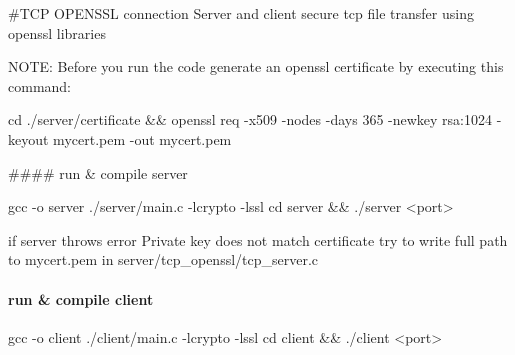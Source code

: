 \#\+T\+CP O\+P\+E\+N\+S\+SL connection Server and client secure tcp file transfer using openssl libraries

N\+O\+TE\+: Before you run the code generate an openssl certificate by executing this command\+: 
\begin{DoxyCode}
cd ./server/certificate && openssl req -x509 -nodes -days 365 -newkey rsa:1024 -keyout mycert.pem -out
       mycert.pem
\end{DoxyCode}


\#\#\#\# run \& compile server 
\begin{DoxyCode}
gcc -o server ./server/main.c -lcrypto -lssl
cd server && ./server <port>
\end{DoxyCode}
 if server throws error {\ttfamily Private key does not match certificate} try to write full path to {\ttfamily mycert.\+pem} in server/tcp\+\_\+openssl/tcp\+\_\+server.\+c

\paragraph*{run \& compile client}


\begin{DoxyCode}
gcc -o client ./client/main.c -lcrypto -lssl
cd client && ./client <port>
\end{DoxyCode}
 